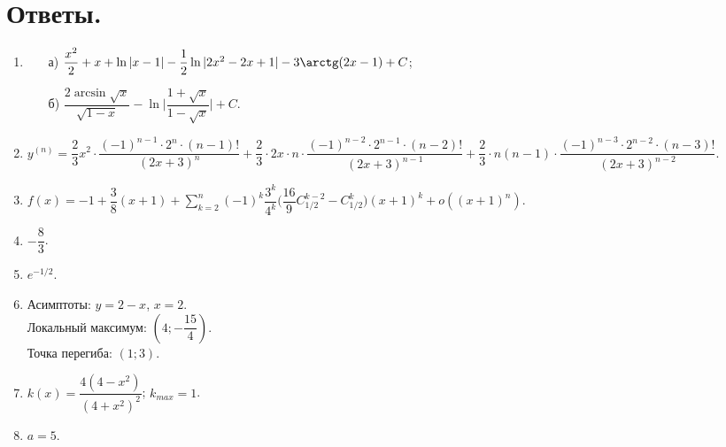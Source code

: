 \documentclass[a4paper,12pt]{article}
\begin{document}
\section*{Ответы.}

\begin{enumerate}
     	\item 
     	\begin{enumerate}
     		\item[а)] $ \dfrac{x^2}{2} + x + \ln|x - 1| - \dfrac{1}{2} \ln |2x^2 - 2x + 1| - 3 \arctg(2x - 1) + C$;
     		\item[б)] $ \dfrac{2 \arcsin \sqrt{x}}{\sqrt{1 - x}} - \ln \bigg| \dfrac{1 + \sqrt{x}}{1 - \sqrt{x}} \bigg| + C$.
     	\end{enumerate} 
     	
     	\item $y^{(n)} = \dfrac{2}{3} x^2 \cdot \dfrac{(-1)^{n - 1} \cdot 2^n \cdot (n - 1)!}{(2x + 3)^n} + \dfrac{2}{3} \cdot 2x \cdot n \cdot \dfrac{(-1)^{n - 2} \cdot 2^{n-1} \cdot (n - 2)!}{(2x + 3)^{n-1}} + \dfrac{2}{3} \cdot n(n - 1) \cdot \dfrac{(-1)^{n - 3} \cdot 2^{n-2} \cdot (n - 3)!}{(2x + 3)^{n-2}}$.
     	\item $f(x) = -1 + \dfrac{3}{8} (x + 1) + \sum\limits_{k = 2}^n (-1)^k \dfrac{3^k}{4^k} \bigg( \dfrac{16}{9} C_{1/2}^{k - 2} - C_{1/2}^k \bigg) (x + 1)^k + o((x+1)^n)$.  
     	\item $-\dfrac{8}{3}$.
     	\item $e^{-1/2}$.
     	\item Асимптоты: $y = 2 - x$, $x = 2$. \\
     		 Локальный максимум: $(4; -\dfrac{15}{4})$. \\
     		 Точка перегиба: $(1; 3)$.
     	\item $k(x) = \dfrac{4 (4 - x^2)}{(4 + x^2)^2}$; $k_{max} = 1$. 
     	\item $a = 5$.	 	     	
\end{enumerate}
\end{document}
